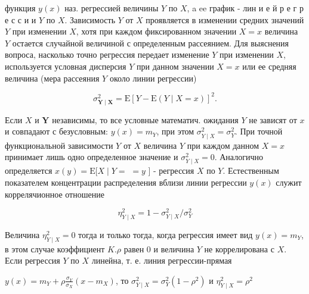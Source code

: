 \documentclass[10pt]{article}
\begin{document}
функция $y(x)$ наз. регрессией величины $Y$ по $X$, a ee график - лин и е й р е г р е с с и и $Y$ по $X$. Зависимость $Y$ от $X$ проявляется в изменении средних значений $Y$ при изменении $X$, хотя при каждом фиксированном значении $X=x$ величина $Y$ остается случайной величиной с определенным рассеянием. Для выяснения вопроса, насколько точно регрессия передает изменение $Y$ при изменении $X$, используется условная дисперсия $Y$ при данном значении $X=x$ или ее средняя величина (мера рассеяния $Y$ около линии регрессии)



\[

\sigma_{\boldsymbol{Y} \mid \boldsymbol{X}}^{2}=\mathrm{E}[Y-\mathrm{E}(Y \mid X=x)]^{2} .

\]



Если $X$ и $\boldsymbol{Y}$ независимы, то все условные математич. ожидания $Y$ не зависят от $x$ и совпадают с безусловным: $y(x)=m_{Y}$, при этом $\sigma_{Y \mid X}^{2}=\sigma_{Y}^{2}$. При точной функциональной зависимости $Y$ от $X$ величина $Y$ при каждом данном $X=x$ принимает лишь одно определенное значение и $\sigma_{Y \mid X}^{2}=0$. Аналогично определяется $x(y)=\mathrm{E}[X \mid Y=$ $=y$ ] - регрессия $X$ по $Y$. Естественным показателем концентрации распределения вблизи линии регрессии $y(x)$ служит коррелячионное отношение



\[

\eta_{Y \mid X}^{2}=1-\sigma_{Y \mid X}^{2} / \sigma_{Y}^{2}

\]



Величина $\eta_{Y \mid X}^{2}=0$ тогда и только тогда, когда регрессия имеет вид $y(x)=m_{Y}$, в этом случае коэффициент $K . \rho$ равен 0 и величина $Y$ не коррелирована с $X$. Если регрессия $Y$ по $X$ линейна, т. е. линия регрессии-прямая



$y(x)=m_{Y}+\rho \frac{\sigma_{Y}}{\sigma_{X}}\left(x-m_{X}\right)$, то $\sigma_{Y \mid X}^{2}=\sigma_{Y}^{2}\left(1-\rho^{2}\right)$ и $\eta_{Y \mid X}^{2}=\rho^{2}$
\end{document}
